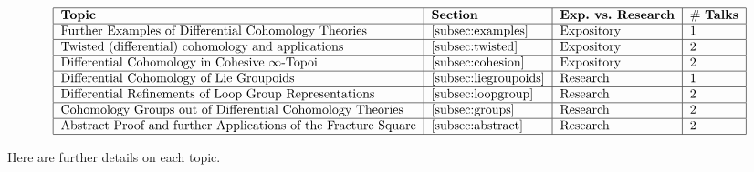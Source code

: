 \documentclass[10pt]{amsart}
\begin{document}
\[
\begin{tabular}{|l|l|l|l|}
  \hline 
  \textbf{Topic} & \textbf{Section} & \textbf{Exp.~vs.~Research} & \# \textbf{Talks}\\ \hline
  Further Examples of Differential Cohomology Theories & \cref{subsec:examples} & Expository & 1 \\ \hline
  Twisted (differential) cohomology and applications & \cref{subsec:twisted} & Expository & 2\\ \hline
  Differential Cohomology in Cohesive $\infty$-Topoi & \cref{subsec:cohesion} & Expository & 2\\ \hline
  Differential Cohomology of Lie Groupoids & \cref{subsec:liegroupoids} & Research & 1\\ \hline
  Differential Refinements of Loop Group Representations & \cref{subsec:loopgroup} & Research & 2\\ \hline
  Cohomology Groups out of Differential Cohomology Theories & \cref{subsec:groups} & Research & 2\\ \hline
  Abstract Proof and further Applications of the Fracture Square & \cref{subsec:abstract} & Research & 2\\ \hline
\end{tabular}
\]

Here are further details on each topic.
\end{document}
